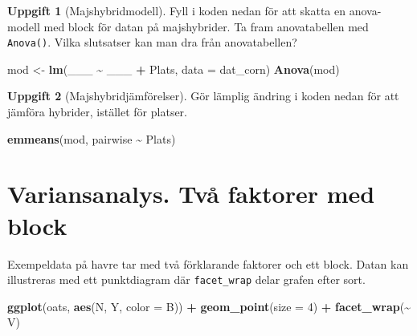 \documentclass[
]{book}
\newenvironment{Shaded}{\begin{snugshade}}{\end{snugshade}}
\newcommand{\AttributeTok}[1]{\textcolor[rgb]{0.13,0.29,0.53}{#1}}
\newcommand{\DecValTok}[1]{\textcolor[rgb]{0.00,0.00,0.81}{#1}}
\newcommand{\FunctionTok}[1]{\textcolor[rgb]{0.13,0.29,0.53}{\textbf{#1}}}
\newcommand{\NormalTok}[1]{#1}
\newcommand{\OtherTok}[1]{\textcolor[rgb]{0.56,0.35,0.01}{#1}}
\newcommand{\SpecialCharTok}[1]{\textcolor[rgb]{0.81,0.36,0.00}{\textbf{#1}}}
\theoremstyle{definition}
\theoremstyle{definition}
\theoremstyle{definition}
\newtheorem{exercise}{Uppgift}[chapter]
\theoremstyle{definition}
\theoremstyle{remark}
\begin{document}
\begin{exercise}[Majshybridmodell]

Fyll i koden nedan för att skatta en anova-modell med block för datan på majshybrider. Ta fram anovatabellen med \texttt{Anova()}. Vilka slutsatser kan man dra från anovatabellen?

\begin{Shaded}
\begin{Highlighting}[]
\NormalTok{mod }\OtherTok{\textless{}{-}} \FunctionTok{lm}\NormalTok{(\_\_\_ }\SpecialCharTok{\textasciitilde{}}\NormalTok{ \_\_\_ }\SpecialCharTok{+}\NormalTok{ Plats, }\AttributeTok{data =}\NormalTok{ dat\_corn)}
\FunctionTok{Anova}\NormalTok{(mod)}
\end{Highlighting}
\end{Shaded}

\end{exercise}

\begin{exercise}[Majshybridjämförelser]

Gör lämplig ändring i koden nedan för att jämföra hybrider, istället för platser.

\begin{Shaded}
\begin{Highlighting}[]
\FunctionTok{emmeans}\NormalTok{(mod, pairwise }\SpecialCharTok{\textasciitilde{}}\NormalTok{ Plats)}
\end{Highlighting}
\end{Shaded}

\end{exercise}

\hypertarget{variansanalys.-tvuxe5-faktorer-med-block}{%
\section{Variansanalys. Två faktorer med block}\label{variansanalys.-tvuxe5-faktorer-med-block}}

Exempeldata på havre tar med två förklarande faktorer och ett block. Datan kan illustreras med ett punktdiagram där \texttt{facet\_wrap} delar grafen efter sort.

\begin{Shaded}
\begin{Highlighting}[]
\FunctionTok{ggplot}\NormalTok{(oats, }\FunctionTok{aes}\NormalTok{(N, Y, }\AttributeTok{color =}\NormalTok{ B)) }\SpecialCharTok{+}
  \FunctionTok{geom\_point}\NormalTok{(}\AttributeTok{size =} \DecValTok{4}\NormalTok{) }\SpecialCharTok{+}
  \FunctionTok{facet\_wrap}\NormalTok{(}\SpecialCharTok{\textasciitilde{}}\NormalTok{ V)}
\end{Highlighting}
\end{Shaded}
\end{document}
